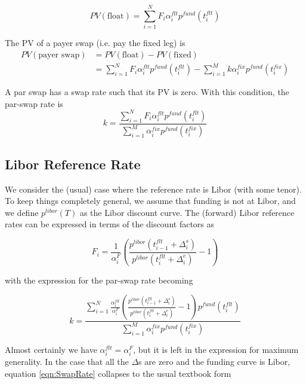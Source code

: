 \begin{equation}
PV(\text{float}) = \sum^N_{i=1} F_i \alpha^{flt}_ip^{fund}(t^{flt}_i)
\end{equation}

The PV of a payer swap (i.e. pay the fixed leg) is
\begin{equation}
\begin{split}
PV(\text{payer swap}) &= PV(\text{float}) - PV(\text{fixed}) \\
&=  \sum^N_{i=1} F_i \alpha^{flt}_ip^{fund}(t^{flt}_i)-\sum^M_{i=1} k \alpha^{fix}_ip^{fund}(t^{fix}_i)
\end{split}
\end{equation}

A par swap has a swap rate such that its PV is zero. With this condition, the par-swap rate is
\begin{equation}
\label{eqn:SwapRate}
k = \frac{\sum^N_{i=1} F_i \alpha^{flt}_ip^{fund}(t^{flt}_i)}{ \sum^M_{i=1} \alpha^{fix}_ip^{fund}(t^{fix}_i)}
\end{equation}

\subsection{Libor Reference Rate}

We consider the (usual) case where the reference rate is Libor (with some tenor).  To keep things completely general, we assume that funding is not at Libor, and we define  $p^{libor}(T)$ as the Libor discount curve. The (forward) Libor reference rates can be expressed in terms of the discount factors as

\begin{equation}
\label{eqn:FowardRate}
F_i = \frac{1}{\alpha^{F}_i }\left(\frac{p^{libor}(t^{flt}_{i-1}+\Delta^s_i)} {p^{libor}(t^{flt}_i+\Delta^e_i)} -1\right)
\end{equation}

with the expression for the par-swap rate becoming

\begin{equation}
\label{eqn:ParSwapRate}
k = \frac{\sum^N_{i=1}  \frac{\alpha^{flt}_i}{\alpha^{F}_i} \left(\frac{p^{libor}(t^{flt}_{i-1}+\Delta^s_i)} {p^{libor}(t^{flt}_i+\Delta^e_i)} -1\right)p^{fund}(t^{flt}_i)}{ \sum^M_{i=1} \alpha^{fix}_ip^{fund}(t^{fix}_i)}
\end{equation}

Almost certainly we have $\alpha^{flt}_i = \alpha^{F}_i$, but it is left in the expression for maximum generality. In the case that all the $\Delta$s are zero and the funding curve is Libor, equation  \ref{eqn:SwapRate} collapses to the usual textbook form

